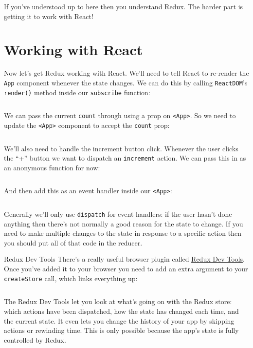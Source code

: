 If you've understood up to here then you understand Redux. The harder part is getting it to work with React!




\section{Working with React}

Now let's get Redux working with React. We'll need to tell React to re-render the \texttt{App} component whenever the state changes. We can do this by calling \texttt{ReactDOM}'s \texttt{render()} method inside our \texttt{subscribe} function:

\inputminted{jsx}{01/figures/02/10-render.js}

We can pass the current \texttt{count} through using a prop on \texttt{<App>}. So we need to update the \texttt{<App>} component to accept the \texttt{count} prop:

\inputminted{jsx}{01/figures/02/11-value.jsx}

We'll also need to handle the increment button click. Whenever the user clicks the ``+'' button we want to dispatch an \texttt{increment} action. We can pass this in as an anonymous function for now:

\inputminted{jsx}{01/figures/02/12-props.jsx}

And then add this as an event handler inside our \texttt{<App>}:

\inputminted{jsx}{01/figures/02/13-handleIncrement.jsx}


Generally we'll only use \texttt{dispatch} for event handlers: if the user hasn't done anything then there's not normally a good reason for the state to change. If you need to make multiple changes to the state in response to a specific action then you should put all of that code in the reducer.


\pagebreak


\begin{infobox}{Redux Dev Tools}
    There's a really useful browser plugin called \href{https://github.com/zalmoxisus/redux-devtools-extension}{Redux Dev Tools}.
    \\

    Once you've added it to your browser you need to add an extra argument to your \texttt{createStore} call, which links everything up:

    \inputminted{jsx}{01/figures/02/09-dev-tools.js}

    The Redux Dev Tools let you look at what's going on with the Redux store: which actions have been dispatched, how the state has changed each time, and the current state. It even lets you change the history of your app by skipping actions or rewinding time. This is only possible because the app's state is fully controlled by Redux.
\end{infobox}


